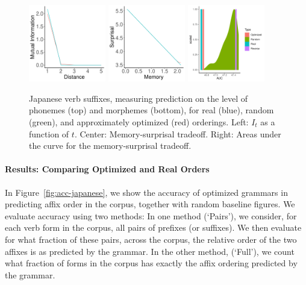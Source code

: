 \begin{figure}
\begin{center}
\includegraphics[width=0.3\textwidth]{figures/Japanese-suffixes-byMorphemes-it-heldout.pdf}
\includegraphics[width=0.3\textwidth]{figures/Japanese-suffixes-byMorphemes-memsurp-heldout.pdf}
\includegraphics[width=0.3\textwidth]{figures/Japanese-suffixes-byMorphemes-auc-hist-heldout.pdf}
\end{center}
	\caption{Japanese verb suffixes, measuring prediction on the level of phonemes (top) and morphemes (bottom), for real (blue), random (green), and approximately optimized (red) orderings. Left: $I_t$ as a function of $t$. Center: Memory-surprisal tradeoff. Right: Areas under the curve for the memory-surprisal tradeoff.}\label{fig:jap-phon-morph}
\end{figure}


\paragraph{Results: Comparing Optimized and Real Orders}

In Figure~\ref{fig:acc-japanese}, we show the accuracy of optimized grammars in predicting affix order in the corpus, together with random baseline figures.
We evaluate accuracy using two methods:
In one method (`Pairs'), we consider, for each verb form in the corpus, all pairs of prefixes (or suffixes).
We then evaluate for what fraction of these pairs, across the corpus, the relative order of the two affixes is as predicted by the grammar.
In the other method, (`Full'), we count what fraction of forms in the corpus has exactly the affix ordering predicted by the grammar.





